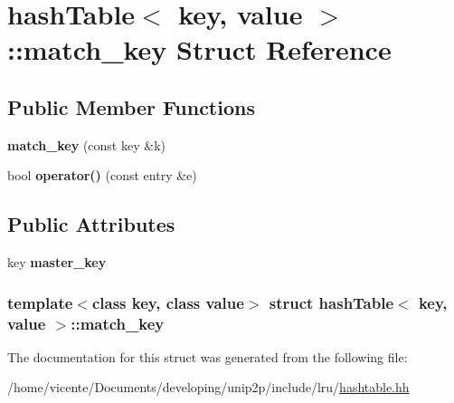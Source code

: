 \hypertarget{structhashTable_1_1match__key}{\section{hash\-Table$<$ key, value $>$\-:\-:match\-\_\-key \-Struct \-Reference}
\label{structhashTable_1_1match__key}
}
\subsection*{\-Public \-Member \-Functions}
\begin{DoxyCompactItemize}
\item 
\hypertarget{structhashTable_1_1match__key_aaf3e8d954aac393b0ad1da8b04ad95f1}{{\bfseries match\-\_\-key} (const key \&k)}\label{structhashTable_1_1match__key_aaf3e8d954aac393b0ad1da8b04ad95f1}

\item 
\hypertarget{structhashTable_1_1match__key_aa2f734ad7af6612f87f8531a5ee3a183}{bool {\bfseries operator()} (const entry \&e)}\label{structhashTable_1_1match__key_aa2f734ad7af6612f87f8531a5ee3a183}

\end{DoxyCompactItemize}
\subsection*{\-Public \-Attributes}
\begin{DoxyCompactItemize}
\item 
\hypertarget{structhashTable_1_1match__key_aee0874642bcbb149ef4247c251a1ad67}{key {\bfseries master\-\_\-key}}\label{structhashTable_1_1match__key_aee0874642bcbb149ef4247c251a1ad67}

\end{DoxyCompactItemize}
\subsubsection*{template$<$class key, class value$>$ struct hash\-Table$<$ key, value $>$\-::match\-\_\-key}



\-The documentation for this struct was generated from the following file\-:\begin{DoxyCompactItemize}
\item 
/home/vicente/\-Documents/developing/unip2p/include/lru/\hyperlink{hashtable_8hh}{hashtable.\-hh}\end{DoxyCompactItemize}
